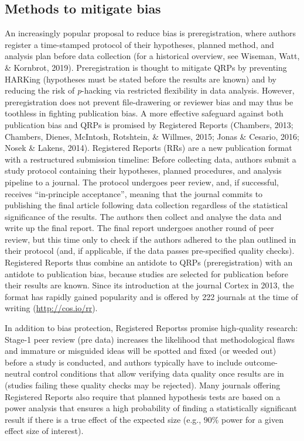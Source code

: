 \documentclass[british,,jou,floatsintext]{apa6}
\begin{document}
\hypertarget{methods-to-mitigate-bias}{%
\subsection{Methods to mitigate bias}\label{methods-to-mitigate-bias}}

An increasingly popular proposal to reduce bias is preregistration, where authors register a time-stamped protocol of their hypotheses, planned method, and analysis plan before data collection (for a historical overview, see Wiseman, Watt, \& Kornbrot, 2019).
Preregistration is thought to mitigate QRPs by preventing HARKing (hypotheses must be stated before the results are known) and by reducing the risk of \emph{p}-hacking via restricted flexibility in data analysis.
However, preregistration does not prevent file-drawering or reviewer bias and may thus be toothless in fighting publication bias.
A more effective safeguard against both publication bias and QRPs is promised by Registered Reports (Chambers, 2013; Chambers, Dienes, McIntosh, Rotshtein, \& Willmes, 2015; Jonas \& Cesario, 2016; Nosek \& Lakens, 2014).
Registered Reports (RRs) are a new publication format with a restructured submission timeline:
Before collecting data, authors submit a study protocol containing their hypotheses, planned procedures, and analysis pipeline to a journal.
The protocol undergoes peer review, and, if successful, receives \enquote{in-principle acceptance}, meaning that the journal commits to publishing the final article following data collection regardless of the statistical significance of the results.
The authors then collect and analyse the data and write up the final report.
The final report undergoes another round of peer review, but this time only to check if the authors adhered to the plan outlined in their protocol (and, if applicable, if the data passes pre-specified quality checks).
Registered Reports thus combine an antidote to QRPs (preregistration) with an antidote to publication bias, because studies are selected for publication before their results are known.
Since its introduction at the journal Cortex in 2013, the format has rapidly gained popularity and is offered by 222 journals at the time of writing (\url{http://cos.io/rr}).

In addition to bias protection, Registered Reportss promise high-quality research: Stage-1 peer review (pre data) increases the likelihood that methodological flaws and immature or misguided ideas will be spotted and fixed (or weeded out) before a study is conducted, and authors typically have to include outcome-neutral control conditions that allow verifying data quality once results are in (studies failing these quality checks may be rejected).
Many journals offering Registered Reports also require that planned hypothesis tests are based on a power analysis that ensures a high probability of finding a statistically significant result if there is a true effect of the expected size (e.g., \(90\%\) power for a given effect size of interest).
\end{document}

